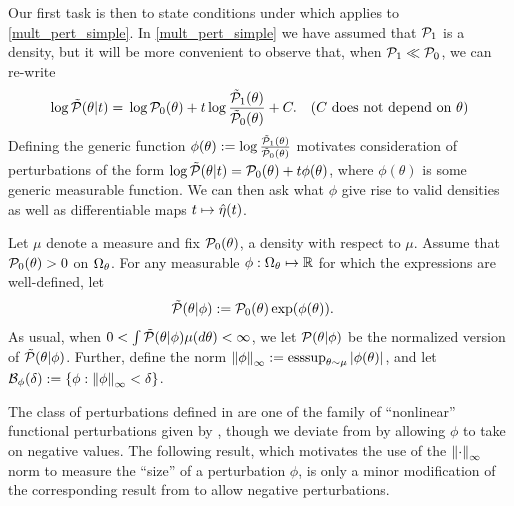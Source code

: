 Our first task is then to state conditions under which 
applies to \eqref{mult_pert_simple}.  In \eqref{mult_pert_simple} we have
assumed that $\mathcal{P}_{1}$ is a density, but it will be more convenient to observe
that, when $\mathcal{P}_{1} \ll \mathcal{P}_{0}$, we can re-write
%
\begin{align*}
%
\log \ptil(\theta \vert \t) ={}&
    \log \pbase(\theta) +
        \t \log \frac{\palttil(\theta)}{\pbasetil(\theta)} +
        \const. & \constdesc{\theta}
%
\end{align*}
%
Defining the generic function $\phi(\theta) := \log
\frac{\tilde{\mathcal{P}}_{1}(\theta)}{\tilde{\mathcal{P}}_{0}(\theta)}$ motivates consideration of
perturbations of the form $\log \tilde{\mathcal{P}}(\theta \vert t) = \mathcal{P}_{0}(\theta) + t
\phi(\theta)$, where $\phi(\theta)$ is some generic measurable function. We can
then ask what $\phi$ give rise to valid densities as well as differentiable maps
$t \mapsto \hat\eta(t)$.

\begin{defn}
%
Let $\mu$ denote a measure and fix $\mathcal{P}_{0}(\theta)$, a density with respect to
$\mu$.  Assume that $\mathcal{P}_{0}(\theta) > 0$ on $\Omega_{\theta}$. For any measurable
$\phi: \Omega_{\theta} \mapsto \mathbb{R}$ for which the expressions are well-defined,
let
%
\begin{align*}
\ptil(\theta \vert \phi) :={}& \pbase(\theta)\exp(\phi(\theta)).
%
\end{align*}
%
As usual, when $0 < \int \tilde{\mathcal{P}}(\theta \vert \phi) \mu(d\theta) < \infty$, we let
$\mathcal{P}(\theta \vert \phi)$ be the normalized version of $\tilde{\mathcal{P}}(\theta \vert \phi)$.
Further, define the norm $\left\Vert\phi\right\Vert_{\infty} := \operatorname*{\mathrm{esssup}}_{\theta \sim \mu}
\left|\phi(\theta)\right|$, and let $\mathcal{B}_\phi(\delta) := \left\{ \phi: \left\Vert\phi\right\Vert_{\infty} <
\delta \right\}$.
%
\end{defn}
%

The class of perturbations defined in  are one of the
family of ``nonlinear'' functional perturbations given by
\citet{gustafson:1996:local}, though we deviate from
\citet{gustafson:1996:local} by allowing $\phi$ to take on negative values. The
following result, which motivates the use of the $\left\Vert\cdot\right\Vert_{\infty}$ norm to
measure the ``size'' of a perturbation $\phi$, is only a minor modification of
the corresponding result from \citet{gustafson:1996:local} to allow negative
perturbations.

